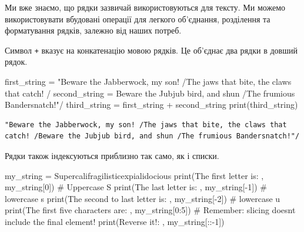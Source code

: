\documentclass[
  letterpaper,
]{report}
\newenvironment{Shaded}{\begin{snugshade}}{\end{snugshade}}
\newcommand{\BuiltInTok}[1]{\textcolor[rgb]{0.00,0.23,0.31}{#1}}
\newcommand{\CommentTok}[1]{\textcolor[rgb]{0.37,0.37,0.37}{#1}}
\newcommand{\DecValTok}[1]{\textcolor[rgb]{0.68,0.00,0.00}{#1}}
\newcommand{\NormalTok}[1]{\textcolor[rgb]{0.00,0.23,0.31}{#1}}
\newcommand{\OperatorTok}[1]{\textcolor[rgb]{0.37,0.37,0.37}{#1}}
\newcommand{\StringTok}[1]{\textcolor[rgb]{0.13,0.47,0.30}{#1}}
\begin{document}
Ми вже знаємо, що рядки зазвичай використовуються для тексту. Ми можемо
використовувати вбудовані операції для легкого об'єднання, розділення та
форматування рядків, залежно від наших потреб.

Символ \texttt{+} вказує на конкатенацію мовою рядків. Це об'єднає два
рядки в довший рядок.

\begin{Shaded}
\begin{Highlighting}[]
\NormalTok{first\_string }\OperatorTok{=} \StringTok{\textquotesingle{}"Beware the Jabberwock, my son! /The jaws that bite, the claws that catch! /\textquotesingle{}}
\NormalTok{second\_string }\OperatorTok{=} \StringTok{\textquotesingle{}Beware the Jubjub bird, and shun /The frumious Bandersnatch!"/\textquotesingle{}}
\NormalTok{third\_string }\OperatorTok{=}\NormalTok{ first\_string }\OperatorTok{+}\NormalTok{ second\_string}
\BuiltInTok{print}\NormalTok{(third\_string)}
\end{Highlighting}
\end{Shaded}

\begin{verbatim}
"Beware the Jabberwock, my son! /The jaws that bite, the claws that catch! /Beware the Jubjub bird, and shun /The frumious Bandersnatch!"/
\end{verbatim}

Рядки також індексуються приблизно так само, як і списки.

\begin{Shaded}
\begin{Highlighting}[]
\NormalTok{my\_string }\OperatorTok{=} \StringTok{\textquotesingle{}Supercalifragilisticexpialidocious\textquotesingle{}}
\BuiltInTok{print}\NormalTok{(}\StringTok{\textquotesingle{}The first letter is: \textquotesingle{}}\NormalTok{, my\_string[}\DecValTok{0}\NormalTok{]) }\CommentTok{\# Uppercase S}
\BuiltInTok{print}\NormalTok{(}\StringTok{\textquotesingle{}The last letter is: \textquotesingle{}}\NormalTok{, my\_string[}\OperatorTok{{-}}\DecValTok{1}\NormalTok{]) }\CommentTok{\# lowercase s}
\BuiltInTok{print}\NormalTok{(}\StringTok{\textquotesingle{}The second to last letter is: \textquotesingle{}}\NormalTok{, my\_string[}\OperatorTok{{-}}\DecValTok{2}\NormalTok{]) }\CommentTok{\# lowercase u}
\BuiltInTok{print}\NormalTok{(}\StringTok{\textquotesingle{}The first five characters are: \textquotesingle{}}\NormalTok{, my\_string[}\DecValTok{0}\NormalTok{:}\DecValTok{5}\NormalTok{]) }\CommentTok{\# Remember: slicing doesn\textquotesingle{}t include the final element!}
\BuiltInTok{print}\NormalTok{(}\StringTok{\textquotesingle{}Reverse it!: \textquotesingle{}}\NormalTok{, my\_string[::}\OperatorTok{{-}}\DecValTok{1}\NormalTok{])}
\end{Highlighting}
\end{Shaded}
\end{document}
